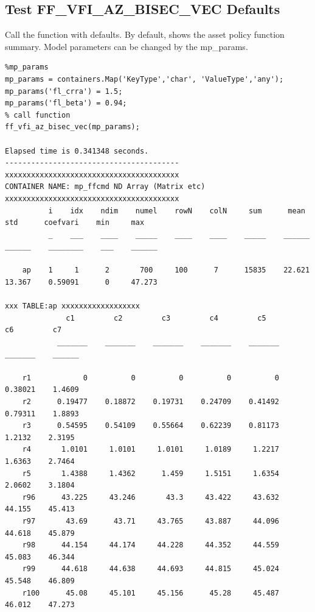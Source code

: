 \documentclass[
]{book}
\begin{document}
\hypertarget{test-ff_vfi_az_bisec_vec-defaults}{%
\subsection{Test FF\_VFI\_AZ\_BISEC\_VEC Defaults}\label{test-ff_vfi_az_bisec_vec-defaults}}

Call the function with defaults. By default, shows the asset policy
function summary. Model parameters can be changed by the mp\_params.

\begin{verbatim}
%mp_params
mp_params = containers.Map('KeyType','char', 'ValueType','any');
mp_params('fl_crra') = 1.5;
mp_params('fl_beta') = 0.94;
% call function
ff_vfi_az_bisec_vec(mp_params);

Elapsed time is 0.341348 seconds.
----------------------------------------
xxxxxxxxxxxxxxxxxxxxxxxxxxxxxxxxxxxxxxxx
CONTAINER NAME: mp_ffcmd ND Array (Matrix etc)
xxxxxxxxxxxxxxxxxxxxxxxxxxxxxxxxxxxxxxxx
          i    idx    ndim    numel    rowN    colN     sum      mean      std      coefvari    min     max  
          _    ___    ____    _____    ____    ____    _____    ______    ______    ________    ___    ______

    ap    1     1      2       700     100      7      15835    22.621    13.367    0.59091      0     47.273

xxx TABLE:ap xxxxxxxxxxxxxxxxxx
              c1         c2         c3         c4         c5         c6         c7  
            _______    _______    _______    _______    _______    _______    ______

    r1            0          0          0          0          0    0.38021    1.4609
    r2      0.19477    0.18872    0.19731    0.24709    0.41492    0.79311    1.8893
    r3      0.54595    0.54109    0.55664    0.62239    0.81173     1.2132    2.3195
    r4       1.0101     1.0101     1.0101     1.0189     1.2217     1.6363    2.7464
    r5       1.4388     1.4362      1.459     1.5151     1.6354     2.0602    3.1804
    r96      43.225     43.246       43.3     43.422     43.632     44.155    45.413
    r97       43.69      43.71     43.765     43.887     44.096     44.618    45.879
    r98      44.154     44.174     44.228     44.352     44.559     45.083    46.344
    r99      44.618     44.638     44.693     44.815     45.024     45.548    46.809
    r100      45.08     45.101     45.156      45.28     45.487     46.012    47.273
\end{verbatim}
\end{document}
